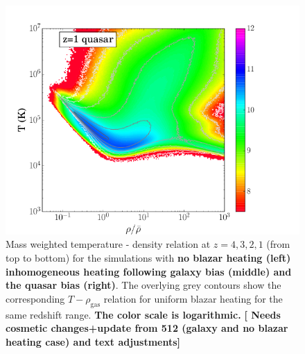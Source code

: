 \documentclass[numberedappendix]{emulateapj}
\newcommand\ALc[1]{{\color{red} \bf #1}} %
\begin{document}
{\begin{figure}
\includegraphics[trim=.5cm 0cm 3cm .5cm, clip ,width = .32\textwidth ]{T_rho_qso_z1_512.png}
\caption{Mass weighted temperature - density relation at $z=4,3,2,1$ (from top to bottom) for the simulations with \ALc{no blazar heating (left) inhomogeneous heating following galaxy bias (middle) and the quasar bias (right)}. The overlying grey contours show the corresponding $T-\rho_{\mathrm{gas}}$ relation for uniform blazar heating \citep{2012MNRAS.423..149P} for the same redshift range. \ALc{The color scale is logarithmic.}\ALc{[{ Needs cosmetic changes+update from 512 (galaxy and no blazar heating case) and text adjustments}]}}
\label{fig:T_rho}
\end{figure}

}
\end{document}
